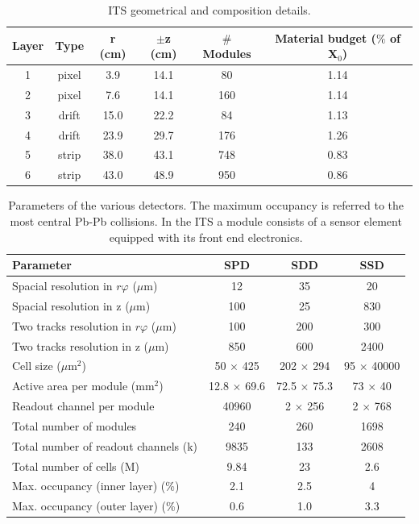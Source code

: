 %
\begin{table}
\centering
\renewcommand\arraystretch{1.5}
 \begin{tabular}{|c|c|c|c|c|c|}
  \hline
  Layer & Type & r (cm) & $\pm$z (cm) & $\#$ Modules & Material budget ($\%$ of X$_0$)\\
  \hline
  1 & pixel & 3.9 & 14.1 & 80 & 1.14 \\
  2 & pixel & 7.6 & 14.1 & 160 & 1.14 \\
  3 & drift & 15.0 & 22.2 & 84 & 1.13 \\
  4 & drift & 23.9 & 29.7 & 176 & 1.26 \\
  5 & strip & 38.0 & 43.1 & 748 & 0.83 \\
  6 & strip & 43.0 & 48.9 & 950 & 0.86 \\
  \hline
 \end{tabular}
 \caption{ITS geometrical and composition details.}
 \label{tab:ITSgeom}
\end{table}
%
\begin{table}
\centering
\renewcommand\arraystretch{1.5}
 \begin{tabular}{|l|c|c|c|}
  \hline
  Parameter & SPD & SDD & SSD \\
  \hline
  Spacial resolution in $r\varphi$ ($\mu$m) & 12 & 35 & 20 \\
  Spacial resolution in z ($\mu$m) & 100 & 25 & 830 \\
  Two tracks resolution in $r\varphi$ ($\mu$m) & 100 & 200 & 300 \\
  Two tracks resolution in z ($\mu$m) & 850 & 600 & 2400 \\
  Cell size ($\mu$m$^2$) & 50 $\times$ 425 & 202 $\times$ 294 & 95 $\times$ 40000 \\
  Active area per module (mm$^2$) & 12.8 $\times$ 69.6 &  72.5 $\times$ 75.3 &  73 $\times$ 40 \\
  Readout channel per module & 40960 & 2 $\times$ 256 & 2 $\times$ 768 \\
  Total number of modules & 240 & 260 & 1698 \\
  Total number of readout channels (k) & 9835 & 133 & 2608 \\
  Total number of cells (M) & 9.84 & 23 & 2.6 \\
  Max. occupancy (inner layer) (\%) & 2.1 & 2.5 & 4 \\
  Max. occupancy (outer layer) (\%) & 0.6 & 1.0 & 3.3 \\
  \hline
 \end{tabular}
 \caption{Parameters of the various detectors. The maximum occupancy is referred to the most central Pb-Pb collisions. In the ITS a module consists of a sensor element equipped with its front end electronics.}
 \label{tab:ITSparam}
\end{table}

